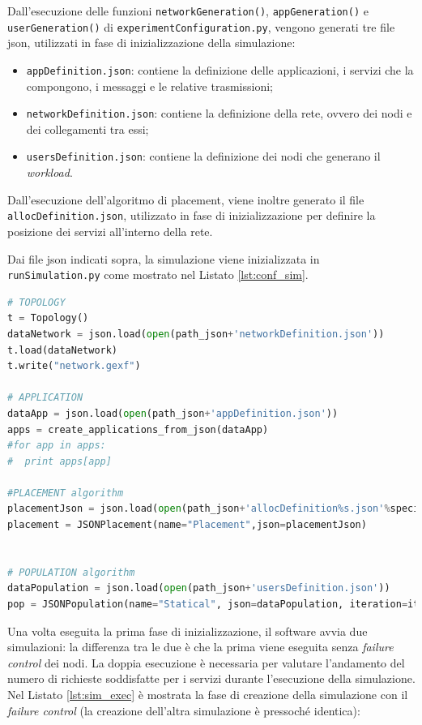 Dall'esecuzione delle funzioni \texttt{networkGeneration()}, \texttt{appGeneration()} e \texttt{userGeneration()} di \texttt{experimentConfiguration.py}, vengono generati tre file json, utilizzati in fase di inizializzazione della simulazione:
\begin{itemize}
	\item \texttt{appDefinition.json}: contiene la definizione delle applicazioni, i servizi che la compongono, i messaggi e le relative trasmissioni;
	\item \texttt{networkDefinition.json}: contiene la definizione della rete, ovvero dei nodi e dei collegamenti tra essi;
	\item \texttt{usersDefinition.json}: contiene la definizione dei nodi che generano il \textit{workload}.
\end{itemize}

Dall'esecuzione dell'algoritmo di placement, viene inoltre generato il file \texttt{allocDefinition.json}, utilizzato in fase di inizializzazione per definire la posizione dei servizi all'interno della rete. 

Dai file json indicati sopra, la simulazione viene inizializzata in \texttt{runSimulation.py} come mostrato nel Listato \ref{lst:conf_sim}.

\begin{lstlisting}[language=python, captionpos=b, caption={Configurazione della simulazione da file json.}, label={lst:conf_sim}]
# TOPOLOGY
t = Topology()
dataNetwork = json.load(open(path_json+'networkDefinition.json'))
t.load(dataNetwork)
t.write("network.gexf")
    
# APPLICATION
dataApp = json.load(open(path_json+'appDefinition.json'))
apps = create_applications_from_json(dataApp)
#for app in apps:
#  print apps[app]

#PLACEMENT algorithm
placementJson = json.load(open(path_json+'allocDefinition%s.json'%specificSuffix))
placement = JSONPlacement(name="Placement",json=placementJson)


# POPULATION algorithm
dataPopulation = json.load(open(path_json+'usersDefinition.json'))
pop = JSONPopulation(name="Statical", json=dataPopulation, iteration=it)
\end{lstlisting}

Una volta eseguita la prima fase di inizializzazione, il software avvia due simulazioni: la differenza tra le due è che la prima viene eseguita senza \textit{failure control} dei nodi. La doppia esecuzione è necessaria per valutare l'andamento del numero di richieste soddisfatte per i servizi durante l'esecuzione della simulazione. Nel Listato \ref{lst:sim_exec} è mostrata la fase di creazione della simulazione con il \textit{failure control} (la creazione dell'altra simulazione è pressoché identica):

